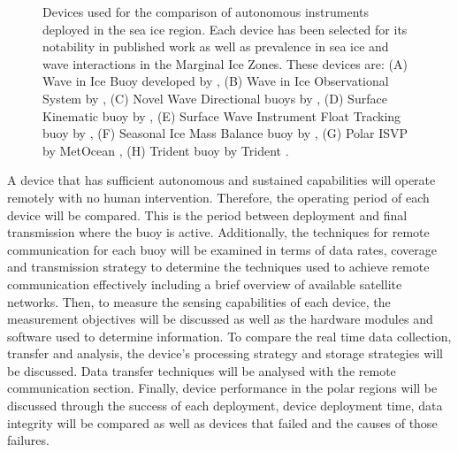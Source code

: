 \begin{figure}[H]
\begin{subfigure}[b]{0.24\textwidth}
		\label{fig:UptempO}
	\end{subfigure}%
	\hfill
	\begin{subfigure}[b]{0.24\textwidth}
		\centering
		\label{fig:trident}
	\end{subfigure}%
	\hfill
	\caption{ Devices used for the comparison of autonomous instruments deployed in the sea ice region. Each device has been selected for its notability in published work as well as prevalence in sea ice and wave interactions in the Marginal Ice Zones. These devices are: (A) Wave in Ice Buoy developed by \textcite{rabault2017measurements} \cite{rabault2017measurements}, (B) Wave in Ice Observational System by \textcite{kohout2015device} \cite{kohout2015device}, (C) Novel Wave Directional buoys by \textcite{doble2017robust} \cite{doble_wave_2015}, (D) Surface Kinematic buoy by \textcite{guimaraes2018surface} \cite{guimaraes2018surface}, (E) Surface Wave Instrument Float Tracking buoy by \textcite{thomson2012wave}  \cite{jim_swift_2012}, (F) Seasonal Ice Mass Balance buoy by \textcite{polashenski2011seasonal} \cite{simbpic}, (G) Polar ISVP  by MetOcean \cite{uptempo}, (H) Trident buoy by Trident \cite{trident}.}
	\label{fig:buoys}
\end{figure}


A device that has sufficient autonomous and sustained capabilities will operate remotely with no human intervention. Therefore, the operating period of each device will be compared. This is the period between deployment and final transmission where the buoy is active. Additionally, the techniques for remote communication for each buoy will be examined in terms of data rates, coverage and transmission strategy to determine the techniques used to achieve remote communication effectively including a brief overview of available satellite networks. Then, to measure the sensing capabilities of each device, the measurement objectives will be discussed as well as the hardware modules and software used to determine information. To compare the real time data collection, transfer and analysis, the device's processing strategy and storage strategies will be discussed. Data transfer techniques will be analysed with the remote communication section. Finally, device performance in the polar regions will be discussed through the success of each deployment, device deployment time, data integrity will be compared as well as devices that failed and the causes of those failures.


